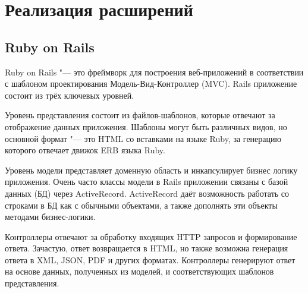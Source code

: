 \chapter{Реализация расширений}

\section{Ruby on Rails}
Ruby on Rails "--- это фреймворк для построения веб-приложений в соответствии с
шаблоном проектирования Модель-Вид-Контроллер (MVC). Rails приложение состоит
из трёх ключевых уровней.

Уровень представления состоит из файлов-шаблонов, которые отвечают за
отображение данных приложения. Шаблоны могут быть различных видов, но основной
формат "--- это HTML со вставками на языке Ruby, за генерацию которого отвечает
движок ERB языка Ruby.

Уровень модели представляет доменную область и инкапсулирует бизнес логику
приложения. Очень часто классы модели в Rails приложении связаны с базой данных
(БД) через ActiveRecord. ActiveRecord даёт возможность работать со строками в
БД как с обычными объектами, а также дополнять эти объекты методами
бизнес-логики.

Контроллеры отвечают за обработку входящих HTTP запросов и формирование ответа.
Зачастую, ответ возвращается в HTML, но также возможна генерация ответа в XML,
JSON, PDF и других форматах. Контроллеры генерируют ответ на основе данных,
полученных из моделей, и соответствующих шаблонов представления.

